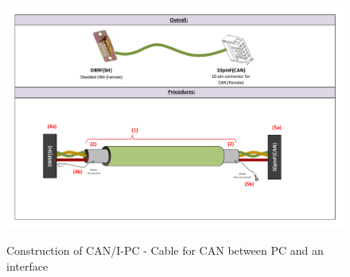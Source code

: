 \begin{figure}
  \centering
  \includegraphics[angle=90,width=1\columnwidth]{figs/body03/FIGCANIPCconstruction.pdf}\\
  \caption[Construction of CAN/I-PC - Cable for CAN between PC and an interface]{Construction of CAN/I-PC - Cable for CAN between PC and an interface}
  \label{FIG:CANIPCconstruction}
\end{figure}

